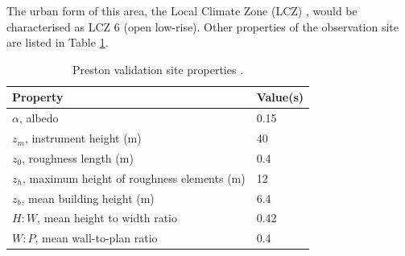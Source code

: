\documentclass[final,3p,times,authoryear]{elsarticle}
\begin{document}







The urban form of this area, the Local Climate Zone (LCZ) \citep{Stewart2012b}, would be characterised as LCZ 6 (open low-rise).  Other properties of the observation site are listed in Table \ref{tab:prvalpara}.

\begin{table}[!htbp]
\caption{Preston validation site properties \citep{Coutts2007}. \label{tab:prvalpara}}     
\begin{tabular}{| l | l |}
\hline
\textbf{Property} & \textbf{Value(s)} \\ \hline
$\alpha$, albedo & 0.15  \\ \hline
$z_{m}$, instrument height (m)&  40  \\ \hline
$z_{0}$, roughness length (m)& 0.4  \\ \hline
$z_{h}$, maximum height of roughness elements (m)& 12  \\ \hline
$z_{b}$, mean building height (m)& 6.4  \\ \hline
$H:W$, mean height to width ratio& 0.42  \\ \hline
$W:P$, mean wall-to-plan ratio &0.4  \\ \hline
\end{tabular}
\end{table}

\end{document}
